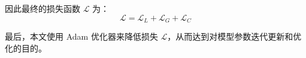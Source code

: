     因此最终的损失函数 $\mathcal{L}$ 为：
    \begin{equation}
        \mathcal{L} = \mathcal{L}_L + \mathcal{L}_G + \mathcal{L}_C
    \end{equation}

    最后，本文使用 Adam\cite{Kingma2015AdamAM} 优化器来降低损失 $\mathcal{L}$，从而达到对模型参数迭代更新和优化的目的。
